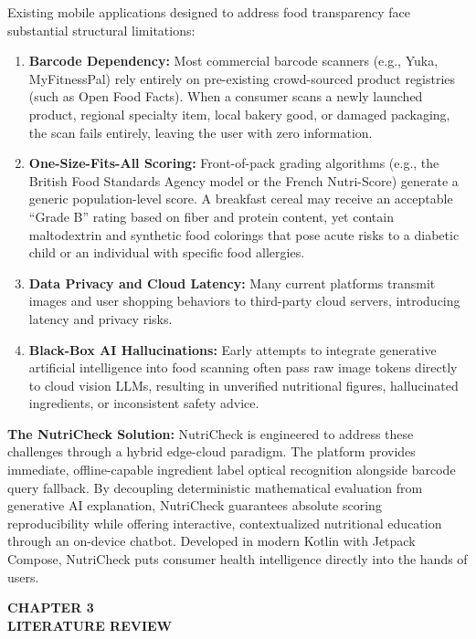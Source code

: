 \documentclass[12pt]{article}
\begin{document}
\noindent
Existing mobile applications designed to address food transparency face substantial structural limitations:
\begin{enumerate}
    \item \textbf{Barcode Dependency:} Most commercial barcode scanners (e.g., Yuka, MyFitnessPal) rely entirely on pre-existing crowd-sourced product registries (such as Open Food Facts). When a consumer scans a newly launched product, regional specialty item, local bakery good, or damaged packaging, the scan fails entirely, leaving the user with zero information.
    \item \textbf{One-Size-Fits-All Scoring:} Front-of-pack grading algorithms (e.g., the British Food Standards Agency model or the French Nutri-Score) generate a generic population-level score. A breakfast cereal may receive an acceptable ``Grade B'' rating based on fiber and protein content, yet contain maltodextrin and synthetic food colorings that pose acute risks to a diabetic child or an individual with specific food allergies.
    \item \textbf{Data Privacy and Cloud Latency:} Many current platforms transmit images and user shopping behaviors to third-party cloud servers, introducing latency and privacy risks.
    \item \textbf{Black-Box AI Hallucinations:} Early attempts to integrate generative artificial intelligence into food scanning often pass raw image tokens directly to cloud vision LLMs, resulting in unverified nutritional figures, hallucinated ingredients, or inconsistent safety advice.
\end{enumerate}

\vspace{0.3cm}

\noindent
\textbf{The NutriCheck Solution:}
NutriCheck is engineered to address these challenges through a hybrid edge-cloud paradigm. The platform provides immediate, offline-capable ingredient label optical recognition alongside barcode query fallback. By decoupling deterministic mathematical evaluation from generative AI explanation, NutriCheck guarantees absolute scoring reproducibility while offering interactive, contextualized nutritional education through an on-device chatbot. Developed in modern Kotlin with Jetpack Compose, NutriCheck puts consumer health intelligence directly into the hands of users.

\newpage

\begin{center}
\textbf{\Large CHAPTER 3}\\[0.5cm]
\textbf{\Large LITERATURE REVIEW}\\[1cm]
\end{center}
\end{document}
